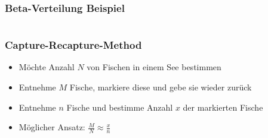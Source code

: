 \documentclass[aspectratio=169,xcolor=dvipsnames]{beamer}
\begin{document}
\begin{frame}
\frametitle{Beta-Verteilung Beispiel}
\begin{columns}
\end{columns}
\end{frame}

\begin{frame}
\frametitle{Capture-Recapture-Method}
\begin{itemize}
\item<1-> Möchte Anzahl $N$ von Fischen in einem See bestimmen
\item<2-> Entnehme $M$ Fische, markiere diese und gebe sie wieder zurück
\item<3-> Entnehme $n$ Fische und bestimme Anzahl $x$ der markierten Fische
\item<4-> Möglicher Ansatz: $\frac{M}{N}\approx \frac{x}{n}$
\end{itemize}
\end{frame}
\end{document}
